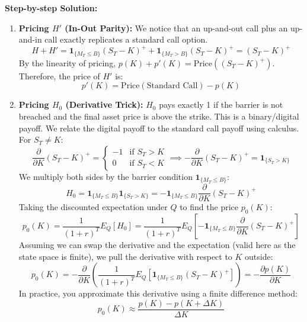 \vspace{0.5cm}
\noindent \textbf{Step-by-step Solution:}
\begin{enumerate}
    \item \textbf{Pricing $H'$ (In-Out Parity):} We notice that an up-and-out call plus an up-and-in call exactly replicates a standard call option.
    \begin{equation*}
        H + H' = \mathbf{1}_{\{M_T \le B\}}(S_T - K)^+ + \mathbf{1}_{\{M_T > B\}}(S_T - K)^+ = (S_T - K)^+
    \end{equation*}
    By the linearity of pricing, $p(K) + p'(K) = \text{Price}((S_T - K)^+)$. 
    Therefore, the price of $H'$ is:
    \begin{equation*}
        p'(K) = \text{Price}(\text{Standard Call}) - p(K)
    \end{equation*}
    
    \item \textbf{Pricing $H_0$ (Derivative Trick):} $H_0$ pays exactly 1 if the barrier is not breached and the final asset price is above the strike. This is a binary/digital payoff. We relate the digital payoff to the standard call payoff using calculus. For $S_T \neq K$:
    \begin{equation*}
        \frac{\partial}{\partial K} (S_T - K)^+ = 
        \begin{cases} 
            -1 & \text{if } S_T > K \\ 
            0 & \text{if } S_T < K 
        \end{cases}
        \implies -\frac{\partial}{\partial K} (S_T - K)^+ = \mathbf{1}_{\{S_T > K\}}
    \end{equation*}
    We multiply both sides by the barrier condition $\mathbf{1}_{\{M_T \le B\}}$:
    \begin{equation*}
        H_0 = \mathbf{1}_{\{M_T \le B\}} \mathbf{1}_{\{S_T > K\}} = -\mathbf{1}_{\{M_T \le B\}} \frac{\partial}{\partial K} (S_T - K)^+
    \end{equation*}
    Taking the discounted expectation under $Q$ to find the price $p_0(K)$:
    \begin{equation*}
        p_0(K) = \frac{1}{(1+r)^T} E_Q[H_0] = \frac{1}{(1+r)^T} E_Q\left[ -\mathbf{1}_{\{M_T \le B\}} \frac{\partial}{\partial K} (S_T - K)^+ \right]
    \end{equation*}
    Assuming we can swap the derivative and the expectation (valid here as the state space is finite), we pull the derivative with respect to $K$ outside:
    \begin{equation*}
        p_0(K) = -\frac{\partial}{\partial K} \left( \frac{1}{(1+r)^T} E_Q\left[ \mathbf{1}_{\{M_T \le B\}} (S_T - K)^+ \right] \right) = -\frac{\partial p(K)}{\partial K}
    \end{equation*}
    In practice, you approximate this derivative using a finite difference method:
    \begin{equation*}
        p_0(K) \approx \frac{p(K) - p(K + \Delta K)}{\Delta K}
    \end{equation*}
\end{enumerate}